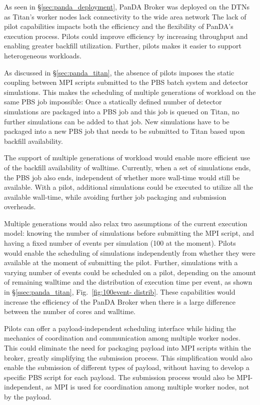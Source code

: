 As seen in \S\ref{sec:panda_deployment}, PanDA Broker was  deployed on the DTNs
as Titan's worker nodes lack connectivity to the wide area network The lack of
pilot capabilities impacts both the efficiency and the flexibility of PanDA's
execution process. Pilots could improve efficiency by increasing throughput and
enabling greater backfill utilization. Further, pilots makes it easier to
support heterogeneous workloads.

As discussed in \S\ref{sec:panda_titan}, the absence of pilots imposes the
static coupling between MPI scripts submitted to the PBS batch system and
detector simulations. This makes the scheduling of multiple generations of
workload on the same PBS job impossible: Once a statically defined number of
detector simulations are packaged into a PBS job and this job is queued on
Titan, no further simulations can be added to that job. New simulations have to
be packaged into a new PBS job that needs to be submitted to Titan based upon
backfill availability.

The support of  multiple generations of workload would enable more efficient use
of the backfill availability of walltime. Currently, when a set of simulations
ends, the PBS job also ends, independent of whether more wall-time would still
be available. With a pilot, additional simulations could be executed  to utilize
all the available wall-time, while avoiding further job packaging and submission
overheads.

Multiple generations would also relax two assumptions of the current execution
model: knowing the number of simulations before submitting the MPI script, and
having a fixed number of events per simulation (100 at the moment). Pilots would
enable the scheduling of simulations independently from whether they were
available at the moment of submitting the pilot. Further, simulations with a
varying number of events could be scheduled on a pilot, depending on the amount
of remaining walltime and the distribution of execution time per event, as shown
in \S\ref{ssec:panda_titan}, Fig.~\ref{fig:100event- distrib}. These
capabilities would increase the efficiency of the PanDA Broker when there is a
large difference between the number of cores and walltime.

Pilots can offer a payload-independent scheduling interface while hiding the
mechanics of coordination and communication among multiple worker nodes. This
could eliminate the need for packaging payload into MPI scripts within the
broker, greatly simplifying the submission process. This simplification would
also enable the submission of different types of payload, without having to
develop a specific PBS script for each payload. The submission process would
also be MPI-independent, as MPI is used for coordination among multiple worker
nodes, not by the payload.

